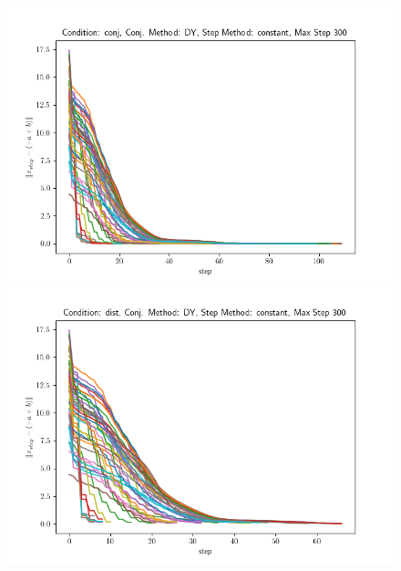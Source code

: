 \documentclass[a4paper,twocolumn,12pt]{article}
\begin{document}
{\begin{figure}[h]
    \begin{minipage}[h]{0.49\linewidth}
      \includegraphics[width=1\linewidth]{./imgs/img3.png}

    \end{minipage}
    \hfill      
    \begin{minipage}[h]{0.49\linewidth}
      \includegraphics[width=1\linewidth]{./imgs/img4.png}
    \end{minipage}
    

\end{figure}}
\end{document}
